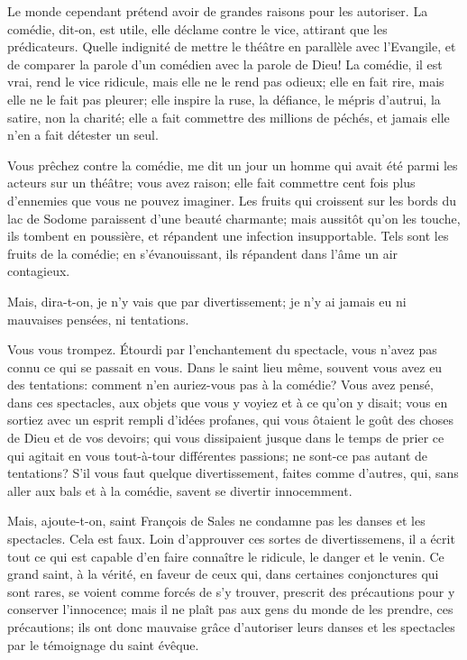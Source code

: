 \documentclass[instructions.tex]{subfiles}
\begin{document}
\secundo Le monde cependant prétend avoir de grandes raisons pour les autoriser. La comédie, dit-on, est utile, elle déclame contre le vice, attirant que les prédicateurs. Quelle indignité de mettre le théâtre en parallèle avec l’Evangile, et de comparer la parole d’un comédien avec la parole de Dieu! La comédie, il est vrai, rend le vice ridicule, mais elle ne le rend pas odieux; elle en fait rire, mais elle ne le fait pas pleurer; elle inspire la ruse, la défiance, le mépris d’autrui, la satire, non la charité; elle a fait commettre des millions de péchés, et jamais elle n’en a fait détester un seul.
 
Vous prêchez contre la comédie, me dit un jour un homme qui avait été parmi les acteurs sur un théâtre; vous avez raison; elle fait commettre cent fois plus d’ennemies que vous ne pouvez imaginer. Les fruits qui croissent sur les bords du lac de Sodome paraissent d’une beauté charmante; mais aussitôt qu’on les touche, ils tombent en poussière, et répandent une infection insupportable. Tels sont les fruits de la comédie; en s’évanouissant, ils répandent dans l’âme un air contagieux.
 
Mais, dira-t-on, je n’y vais que par divertissement; je n’y ai jamais eu ni mauvaises pensées, ni tentations.
 
Vous vous trompez. Étourdi par l’enchantement du spectacle, vous n’avez pas connu ce qui se passait en vous. Dans le saint lieu même, souvent vous avez eu des tentations: comment n’en auriez-vous pas à la comédie? Vous avez pensé, dans ces spectacles, aux objets que vous y voyiez et à ce qu’on y disait; vous en sortiez avec un esprit rempli d’idées profanes, qui vous ôtaient le goût des choses de Dieu et de vos devoirs; qui vous dissipaient jusque dans le temps de prier ce qui agitait en vous tout-à-tour différentes passions; ne sont-ce pas autant de tentations? S’il vous faut quelque divertissement, faites comme d’autres, qui, sans aller aux bals et à la comédie, savent se divertir innocemment.
 
Mais, ajoute-t-on, saint François de Sales ne condamne pas les danses et les spectacles. Cela est faux. Loin d’approuver ces sortes de divertissemens, il a écrit tout ce qui est capable d’en faire connaître le ridicule, le danger et le venin. Ce grand saint, à la vérité, en faveur de ceux qui, dans certaines conjonctures qui sont rares, se voient comme forcés de s’y trouver, prescrit des précautions pour y conserver l’innocence; mais il ne plaît pas aux gens du monde de les prendre, ces précautions; ils ont donc mauvaise grâce d’autoriser leurs danses et les spectacles par le témoignage du saint évêque.
 
\end{document}
